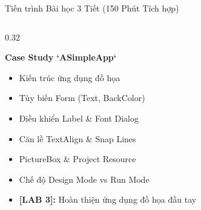\documentclass[aspectratio=169, 10pt]{beamer}
\begin{document}
\begin{frame}{Tiến trình Bài học 3 Tiết (150 Phút Tích hợp)}
\begin{columns}[T]
    \begin{column}{0.32\textwidth}
      \begin{tcolorbox}[colback=UniGreen!5,colframe=UniGreen,title=\textbf{TIẾT 3 (50')},fonttitle=\small\bfseries]
        \textbf{Case Study `ASimpleApp`}
        \begin{itemize}\scriptsize
          \item Kiến trúc ứng dụng đồ họa
          \item Tùy biến Form (Text, BackColor)
          \item Điều khiển Label \& Font Dialog
          \item Căn lề TextAlign \& Snap Lines
          \item PictureBox \& Project Resource
          \item Chế độ Design Mode vs Run Mode
          \item \textbf{[LAB 3]:} Hoàn thiện ứng dụng đồ họa đầu tay
        \end{itemize}
      \end{tcolorbox}
    \end{column}
  \end{columns}
\end{frame}
\end{document}
